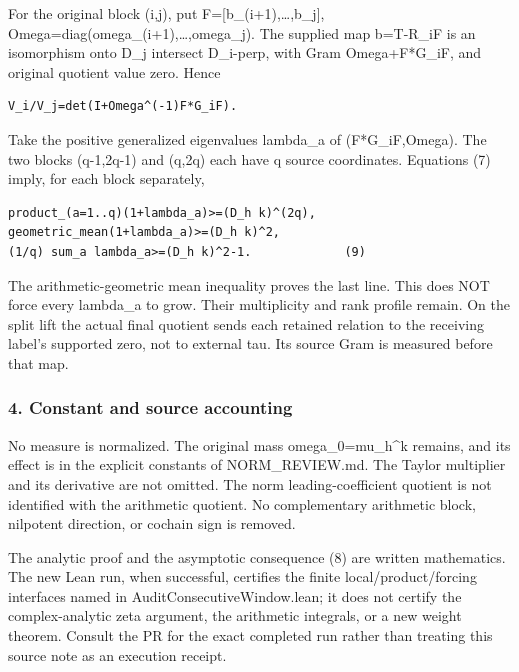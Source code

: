 For the original block (i,j), put F={[}b\_(i+1),\ldots,b\_j{]}, Omega=diag(omega\_(i+1),\ldots,omega\_j). The supplied map b=T-R\_iF is an isomorphism onto D\_j intersect D\_i-perp, with Gram Omega+F*G\_iF, and original quotient value zero. Hence

\begin{verbatim}
V_i/V_j=det(I+Omega^(-1)F*G_iF).
\end{verbatim}

Take the positive generalized eigenvalues lambda\_a of (F*G\_iF,Omega). The two blocks (q-1,2q-1) and (q,2q) each have q source coordinates. Equations (7) imply, for each block separately,

\begin{verbatim}
product_(a=1..q)(1+lambda_a)>=(D_h k)^(2q),
geometric_mean(1+lambda_a)>=(D_h k)^2,
(1/q) sum_a lambda_a>=(D_h k)^2-1.             (9)
\end{verbatim}

The arithmetic-geometric mean inequality proves the last line. This does NOT force every lambda\_a to grow. Their multiplicity and rank profile remain. On the split lift the actual final quotient sends each retained relation to the receiving label's supported zero, not to external tau. Its source Gram is measured before that map.

\subsubsection{4. Constant and source accounting}\label{endpoint-pr25_consecutive_original--constant-and-source-accounting}

No measure is normalized. The original mass omega\_0=mu\_h\^{}k remains, and its effect is in the explicit constants of NORM\_REVIEW.md. The Taylor multiplier and its derivative are not omitted. The norm leading-coefficient quotient is not identified with the arithmetic quotient. No complementary arithmetic block, nilpotent direction, or cochain sign is removed.

The analytic proof and the asymptotic consequence (8) are written mathematics. The new Lean run, when successful, certifies the finite local/product/forcing interfaces named in AuditConsecutiveWindow.lean; it does not certify the complex-analytic zeta argument, the arithmetic integrals, or a new weight theorem. Consult the PR for the exact completed run rather than treating this source note as an execution receipt.
